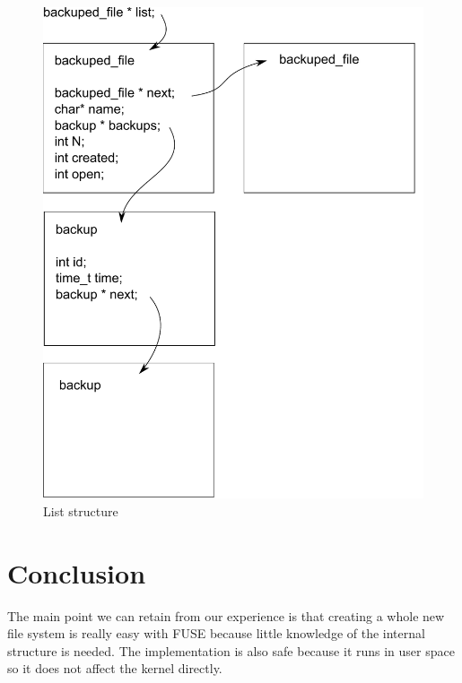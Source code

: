 \documentclass[a4paper]{article}
\begin{document}
\begin{figure}[h!]
	\centering
	\includegraphics[width=0.7\columnwidth]{schema.pdf}
	\caption{List structure \label{fig:schema}}
\end{figure}

\section{Conclusion}
The main point we can retain from our experience is that creating a whole new file system is really easy with FUSE because little knowledge of the internal structure is needed. The implementation is also safe because it runs in user space so it does not affect the kernel directly.
\end{document}
